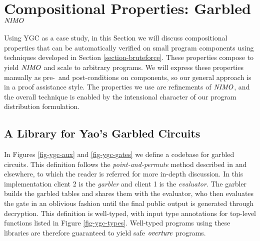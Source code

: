 \section{Compositional Properties: Garbled $\mathit{NIMO}$}
\label{section-composition}

Using YGC as a case study, in this Section we will discuss
compositional properties that can be automatically verified on small
program components using techniques developed in Section
\ref{section-bruteforce}. These properties compose to yield $\mathit{NIMO}$
and scale to arbitrary programs. We will express these properties
manually as pre-~and post-conditions on components, so our
general approach is in a proof assistance style. The properties
we use are refinements of $\mathit{NIMO}$, and the overall technique is
enabled by the intensional character of our program distribution
formulation.

\subsection{A Library for Yao's Garbled Circuits}
\label{section-metalang-ygc}



In Figures \ref{fig-ygc-aux} and \ref{fig-ygc-gates} we define a
codebase for garbled circuits. This definition follows the
\emph{point-and-permute} method described in \cite{evans2018pragmatic} and elsewhere,
to which the reader is referred for more in-depth discussion.
In this implementation client 2 is the \emph{garbler} and
client 1 is the \emph{evaluator}. The garbler builds the garbled
tables and shares them with the evaluator, who then evaluates
the gate in an oblivious fashion until the final public output is
generated through decryption. This definition is well-typed,
with input type annotations for top-level functions listed in
Figure \ref{fig-ygc-types}. Well-typed programs using these
libraries are therefore guaranteed to yield safe $\mathit{overture}$
programs. 

